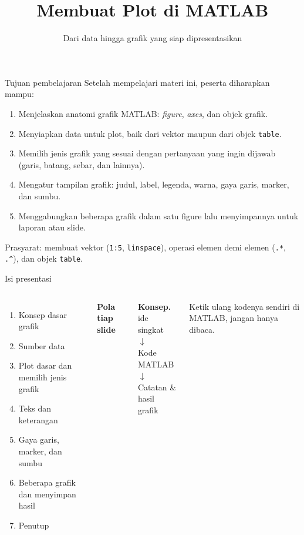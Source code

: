 \documentclass[10pt,aspectratio=169]{beamer}
\title{Membuat Plot di MATLAB}
\subtitle{Dari data hingga grafik yang siap dipresentasikan}
\institute{Pemrograman MATLAB}
\date{}
\newcommand{\kd}[1]{\texttt{#1}}
\begin{document}
\maketitle
\setcounter{framenumber}{0}

\begin{frame}{Tujuan pembelajaran}
Setelah mempelajari materi ini, peserta diharapkan mampu:
\begin{enumerate}
  \item Menjelaskan \alert{anatomi} grafik MATLAB: \emph{figure}, \emph{axes}, dan objek grafik.
  \item Menyiapkan data untuk plot, baik dari vektor maupun dari objek \kd{table}.
  \item \alert{Memilih} jenis grafik yang sesuai dengan pertanyaan yang ingin dijawab (garis, batang, sebar, dan lainnya).
  \item Mengatur tampilan grafik: judul, label, legenda, warna, gaya garis, marker, dan sumbu.
  \item Menggabungkan beberapa grafik dalam satu figure lalu \alert{menyimpannya} untuk laporan atau slide.
\end{enumerate}

\medskip
{\small Prasyarat: membuat vektor (\kd{1:5}, \kd{linspace}), operasi elemen demi elemen (\kd{.*}, \kd{.\textasciicircum}), dan objek \kd{table}.}
\end{frame}

\begin{frame}{Isi presentasi}
\begin{columns}[c,onlytextwidth]
\begin{enumerate}
  \item Konsep dasar grafik
  \item Sumber data
  \item Plot dasar dan memilih jenis grafik
  \item Teks dan keterangan
  \item Gaya garis, marker, dan sumbu
  \item Beberapa grafik dan menyimpan hasil
  \item Penutup
\end{enumerate}
\small
\textbf{Pola tiap slide}\par\smallskip
\alert{\textbf{Konsep.}} ide singkat\\
$\downarrow$\\
Kode MATLAB\\
$\downarrow$\\
Catatan \& hasil grafik\par\medskip
Ketik ulang kodenya sendiri di MATLAB, jangan hanya dibaca.
\end{columns}
\end{frame}
\end{document}

